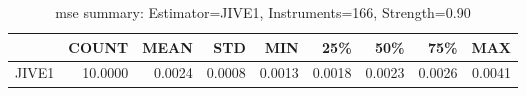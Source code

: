 \begin{table}[ht]
\centering
\caption{mse summary: Estimator=JIVE1, Instruments=166, Strength=0.90}
\begin{tabular}{lrrrrrrrr}
\toprule
 & COUNT & MEAN & STD & MIN & 25\% & 50\% & 75\% & MAX \\
\midrule
JIVE1 & 10.0000 & 0.0024 & 0.0008 & 0.0013 & 0.0018 & 0.0023 & 0.0026 & 0.0041 \\
\bottomrule
\end{tabular}
\end{table}

